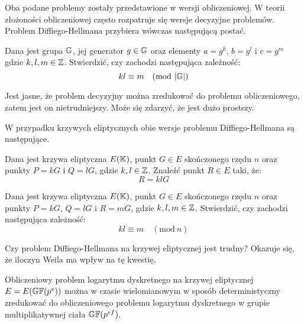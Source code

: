 Oba podane problemy zostały przedstawione w wersji obliczeniowej.
W teorii złożoności obliczeniowej często rozpatruje się wersje decyzyjne
problemów. Problem Diffiego-Hellmana przybiera wówczas następującą postać.

\begin{problem}
Dana jest grupa $\mathbb{G}$,
jej generator $g \in \mathbb{G}$
oraz elementy $a = g^k$, $b = g^l$ i $c = g^m$
gdzie $k, l, m \in \mathbb{Z}$.
Stwierdzić, czy zachodzi następująca zależność:
\begin{equation}
kl \equiv m \quad (\mathrm{mod}\ \lvert\mathbb{G}\rvert)
\end{equation}
\end{problem}

Jest jasne, że problem decyzyjny można zredukować do problemu obliczeniowego,
zatem jest on nietrudniejszy. Może się zdarzyć, że jest dużo prostszy.

W przypadku krzywych eliptycznych obie wersje problemu Diffiego-Hellmana
są następujące.

\begin{problem}
Dana jest krzywa eliptyczna $E(\mathbb{K})$,
punkt $G \in E$ skończonego rzędu $n$
oraz punkty $P = kG$ i $Q = lG$,
gdzie $k, l \in \mathbb{Z}$.
Znaleźć punkt $R \in E$ taki, że:
\begin{equation}
R = klG
\end{equation}
\end{problem}

\begin{problem}
Dana jest krzywa eliptyczna $E(\mathbb{K})$,
punkt $G \in E$ skończonego rzędu $n$
oraz punkty $P = kG$, $Q = lG$ i $R = mG$,
gdzie $k, l, m \in \mathbb{Z}$.
Stwierdzić, czy zachodzi następująca zależność:
\begin{equation}
kl \equiv m \quad (\mathrm{mod}\ n)
\end{equation}
\end{problem}

Czy problem Diffiego-Hellmana na krzywej eliptycznej jest trudny?
Okazuje się, że iloczyn Weila ma wpływ na tę kwestię.

\begin{theorem}
Obliczeniowy problem logarytmu dyskretnego
na krzywej eliptycznej $E = E(\mathbb{GF}(p^e))$
można w czasie wielomianowym w sposób deterministyczny zredukować
do obliczeniowego problemu logarytmu dyskretnego
w grupie multiplikatywnej ciała $\mathbb{GF}(p^{ef})$.
\end{theorem}

